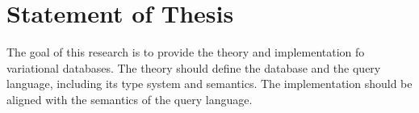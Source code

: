 \section{Statement of Thesis}
\label{sec:stmt}
The goal of this research is to provide the theory and implementation fo variational databases.
The theory should define the database and the query language, including its type system and semantics.
The implementation should be aligned with the semantics of the query language.
%
%


